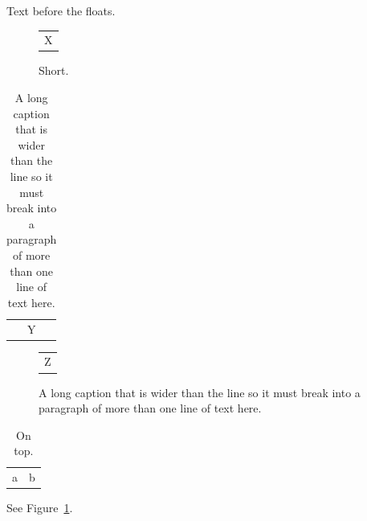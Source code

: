 \documentclass{article}
\begin{document}
Text before the floats.
\begin{figure}[h]
\centering
\begin{tabular}{c}X\end{tabular}
\caption{Short.}
\label{fig:a}
\end{figure}
\begin{table}[h]
\caption{A long caption that is wider than the line so it must break into a paragraph of more than one line of text here.}
\begin{tabular}{c}Y\end{tabular}
\end{table}
\begin{figure}[h]
\centering
\begin{tabular}{c}Z\end{tabular}
\caption{A long caption that is wider than the line so it must break into a paragraph of more than one line of text here.}
\end{figure}
\begin{table}[h]
\centering
\caption{On top.}
\begin{tabular}{ll}
a & b \\
\end{tabular}
\end{table}
See Figure~\ref{fig:a}.
\end{document}
